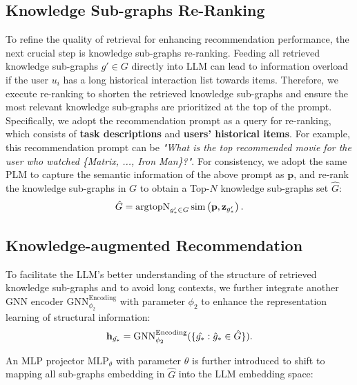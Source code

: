 \subsection{Knowledge Sub-graphs Re-Ranking} 
To refine the quality of retrieval for enhancing recommendation performance, the next crucial step is knowledge sub-graphs re-ranking.
Feeding all retrieved knowledge sub-graphs $g' \in G$ directly into LLM can lead to information overload if the user ${u_i}$ has a long historical interaction list towards items.
Therefore, we execute re-ranking to shorten the retrieved knowledge sub-graphs and ensure the most relevant knowledge sub-graphs are prioritized at the top of the prompt. 
Specifically, we adopt the recommendation prompt as a query for re-ranking, which consists of \textbf{task descriptions} and \textbf{users’ historical items}.
For example, this recommendation prompt can be \textit{"What is the top recommended movie for the user who watched \{Matrix, ..., Iron Man\}?"}. 
For consistency, we adopt the same PLM to capture the semantic information of the above prompt as $\textbf{p}$, and re-rank the knowledge sub-graphs in $G$ to obtain a  Top-$N$ knowledge sub-graphs set $\hat{G}$: 
\begin{equation}
\setlength{\abovedisplayskip}{3pt}
\setlength{\belowdisplayskip}{3pt}
\hat{G}=\operatorname{argtopN}_{g_*' \in G} \text{sim} \left(\textbf{p}, \textbf{z}_{g_*'} \right).
\end{equation}



 \subsection{Knowledge-augmented Recommendation}
To facilitate the LLM's better understanding of the structure of retrieved knowledge sub-graphs and to avoid long contexts, we further integrate another  GNN encoder $\text{GNN}^{\text{Encoding}}_{\phi_2}$ with parameter ${\phi_2}$ to enhance the representation learning of structural information:
\begin{equation}
\setlength{\abovedisplayskip}{3pt}
\setlength{\belowdisplayskip}{3pt}
\textbf{h}_{\hat{g_*}}=\text{GNN}^{\text{Encoding}}_{\phi_2}(\{\hat{g_*}: \hat{g}_*\in \hat{G}\}).
\end{equation}



An MLP projector $\text{MLP}_{\theta}$ with parameter $\theta$ is further introduced to shift to mapping all sub-graphs embedding in $\hat{G}$ into the LLM embedding space:

